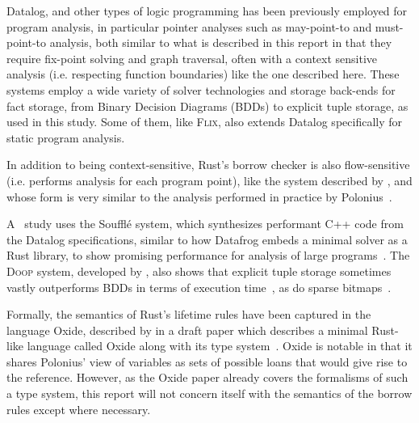 \documentclass[11pt,a4paper,twoside,openany]{report}
\begin{document}
Datalog, and other types of logic programming has been previously employed for
program analysis, in particular pointer analyses such as may-point-to and
must-point-to analysis, both similar to what is described in this report in that
they require fix-point solving and graph traversal, often with a context
sensitive analysis (i.e. respecting function boundaries) like the
one described here\cite{Dawson:1996:PPA:231379.231399,
  Berndl:2003:PAU:780822.781144, hajiyev_codequest:_2005,
  Whaley:2004:CCP:996893.996859, lam_context-sensitive_2005,
  Benton:2007:ISD:1273920.1273923, Hardekopf:2007:AGF:1250734.1250767,
  Smaragdakis:2011:PYC:1926385.1926390, smaragdakis_using_2010,
  balatsouras_datalog_2017, Madsen:2016:DFD:2908080.2908096,
  Eichberg:2008:DCC:1368088.1368142}. These systems employ a wide variety of
solver technologies and storage back-ends for fact storage, from Binary
Decision Diagrams (BDDs) to explicit tuple storage, as used in this study. Some
of them, like \textsc{Flix}, also extends Datalog specifically for static
program analysis\cite{Madsen:2016:DFD:2908080.2908096}.

In addition to being context-sensitive, Rust's borrow checker is also
flow-sensitive (i.e. performs analysis for each program point), like the system
described by \citeauthor{Hardekopf:2009:SFP:1480881.1480911}, and whose form is
very similar to the analysis performed in practice by
Polonius~\cite{Hardekopf:2009:SFP:1480881.1480911}.

A \citeyear{scholz_fast_2016}~study uses the Souffl{\'e} system, which
synthesizes performant C++ code from the Datalog specifications, similar to how
Datafrog embeds a minimal solver as a Rust library, to show promising
performance for analysis of large programs~\cite{scholz_fast_2016}. The
\textsc{Doop} system, developed by \citeauthor{smaragdakis_using_2010}, also
shows that explicit tuple storage sometimes vastly outperforms BDDs in terms of
execution time~\cite{smaragdakis_using_2010}, as do sparse
bitmaps~\cite{Hardekopf:2007:AGF:1250734.1250767}.

Formally, the semantics of Rust's lifetime rules have been captured in the
language Oxide, described by \citeauthor{weiss_oxide:_2019} in a draft paper
which describes a minimal Rust-like language called Oxide along with its type
system~\cite{weiss_oxide:_2019}. Oxide is notable in that it shares
Polonius' view of variables as sets of possible loans that would give rise to
the reference. However, as the Oxide paper already covers the formalisms of such
a type system, this report will not concern itself with the semantics of the
borrow rules except where necessary.
\end{document}
